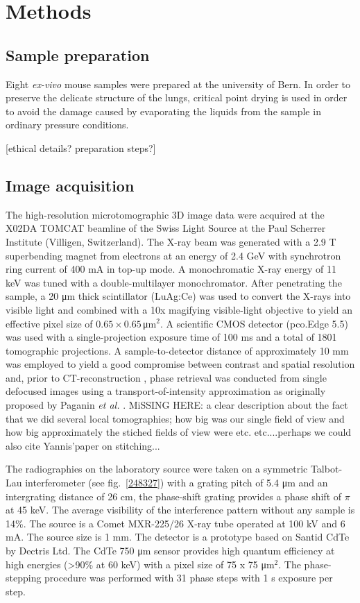 \section{Methods}\label{sec:methods}
\subsection{Sample preparation}
Eight \emph{ex-vivo} mouse samples were prepared at the university of Bern.
In order to preserve the delicate structure of the lungs, critical point
drying is used in order to avoid the damage caused by evaporating the liquids
from the sample in ordinary pressure conditions.

[ethical details? preparation steps?]

\subsection{Image acquisition}\label{sec:acquisition}
The high-resolution microtomographic 3D image data were acquired at the X02DA TOMCAT beamline of the Swiss Light Source at the Paul Scherrer Institute (Villigen, Switzerland). The X-ray beam was generated with a 2.9 T superbending magnet from electrons at an energy of 2.4 GeV with synchrotron ring current of 400 mA in top-up mode. A monochromatic X-ray energy of 11 keV was tuned with a double-multilayer monochromator. After penetrating the sample, a 20 μm thick scintillator (LuAg:Ce) was used to convert the X-rays into visible light and combined with a 10x magifying visible-light objective to yield an effective pixel size of $0.65 \times 0.65\,$μm$^2$. A scientific CMOS detector (pco.Edge 5.5) was used with a single-projection exposure time of 100 ms and a total of 1801 tomographic projections. A sample-to-detector distance of approximately 10 mm was employed to yield a good compromise between contrast and spatial resolution and, prior to CT-reconstruction , phase retrieval was conducted from single defocused images using a transport-of-intensity approximation as originally proposed by Paganin \textit{et al.} \cite{Paganin2002}. MiSSING HERE: a clear description about the fact that we did several local tomographies; how big was our single field of view and how big approximately the stiched fields of view were etc. etc....perhaps we could also cite Yannis'paper on stitching...

The radiographies on the laboratory source were taken on a symmetric
Talbot-Lau interferometer (see fig.~\ref{248327}) with a grating pitch of 5.4 μm and an intergrating
distance of 26 cm, the phase-shift grating provides a phase shift of $\pi$
at 45 keV. The average visibility of the interference pattern without any
sample is 14\%. The source is a Comet MXR-225/26 X-ray tube operated at 100
kV and 6 mA. The source size is 1 mm. The detector is a prototype based on
Santid CdTe by Dectris Ltd. The CdTe 750 μm sensor provides high quantum
efficiency at high energies (>90\% at 60 keV) with a pixel size of 75 x 75
μm$^2$. The phase-stepping procedure was performed with 31 phase steps with
1 s exposure per step.
